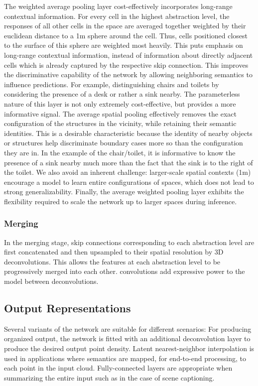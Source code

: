 \documentclass[runningheads]{llncs}
\begin{document}
The weighted average pooling layer cost-effectively incorporates long-range contextual information. For every cell in the highest abstraction level, the responses of all other cells in the space are averaged together weighted by their euclidean distance to a 1m sphere around the cell. Thus, cells positioned closest to the surface of this sphere are weighted most heavily. This puts emphasis on long-range contextual information, instead of information about directly adjacent cells which is already captured by the respective  skip connection. This improves the discriminative capability of the network by allowing neighboring semantics to influence predictions. For example, distinguishing chairs and toilets by considering the presence of a desk or rather a sink nearby. The parameterless nature of this layer is not only extremely cost-effective, but provides a more informative signal. The average spatial pooling effectively removes the exact configuration of the structures in the vicinity, while retaining their semantic identities. This is a desirable characteristic because the identity of nearby objects or structures help discriminate boundary cases more so than the configuration they are in. In the example of the chair/toilet, it is informative to know the presence of a sink nearby much more than the fact that the sink is to the right of the toilet. We also avoid an inherent challenge: larger-scale spatial contexts (1m) encourage a model to learn entire configurations of spaces, which does not lead to strong generalizability. Finally, the average weighted pooling layer exhibits the flexibility required to scale the network up to larger spaces during inference.

\subsubsection{Merging}
In the merging stage, skip connections corresponding to each abstraction level are first concatenated and then upsampled to  their spatial resolution by 3D deconvolutions. This allows the features at each abstraction level to be progressively merged into each other.  convolutions add expressive power to the model between deconvolutions.

\subsection{Output Representations}

Several variants of the network are suitable for different scenarios: For producing organized output, the network is fitted with an additional deconvolution layer to produce the desired output point density. Latent nearest-neighbor interpolation is used in applications where semantics are mapped, for end-to-end processing, to each point in the input cloud. Fully-connected layers are appropriate when summarizing the entire input such as in the case of scene captioning.\\
\end{document}
